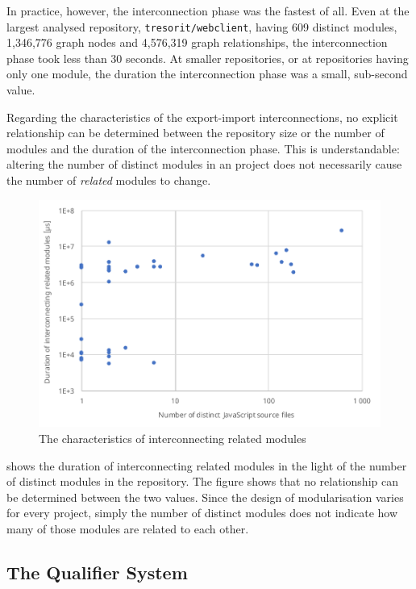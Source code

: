 In practice, however, the interconnection phase was the fastest of all. Even at the largest analysed repository, \lstinline{tresorit/webclient}, having 609 distinct \es modules, 1,346,776 graph nodes and 4,576,319 graph relationships, the interconnection phase took less than 30 seconds. At smaller repositories, or at repositories having only one module, the duration the interconnection phase was a small, sub-second value.

Regarding the characteristics of the export-import interconnections, no explicit relationship can be determined between the repository size or the number of modules and the duration of the interconnection phase. This is understandable: altering the number of distinct modules in an \es project does not necessarily cause the number of \emph{related} modules to change.

\begin{figure}[!htb]
	\centerfloat
	\includegraphics[width=\textwidth,clip]{figures/measurement-interconnecttime-modules.pdf}
	\caption{The characteristics of interconnecting related modules}
	\label{fig:measurement-interconnecttime-modules}
\end{figure}

 shows the duration of interconnecting related modules in the light of the number of distinct modules in the repository. The figure shows that no relationship can be determined between the two values. Since the design of modularisation varies for every project, simply the number of distinct modules does not indicate how many of those modules are related to each other.


\subsection{The Qualifier System}

